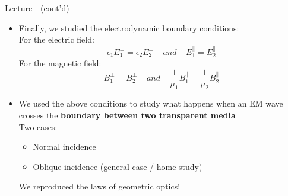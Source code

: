 \begin{frame}{Lecture \summarizedlecture - \lecturesummarytitle (cont'd)}

\begin{itemize}

\item Finally, we studied the electrodynamic boundary conditions:\\
          \vspace{0.2cm}
         For the electric field:
         \begin{equation*}
               \epsilon_1 E_1^{\perp} = \epsilon_2 E_2^{\perp}  \;\;\;\; and \;\;\;\;
                E_1^{\parallel} = E_2^{\parallel}
         \end{equation*}
         For the magnetic field:
         \begin{equation*}
               B_1^{\perp} = B_2^{\perp} \;\;\;\; and \;\;\;\;
               \frac{1}{\mu_1} B_1^{\parallel} = \frac{1}{\mu_2} B_2^{\parallel}
         \end{equation*}

\item We used the above conditions to study what happens when
          an EM wave crosses the {\bf boundary between two transparent media}\\
          \vspace{0.2cm}
          Two cases:
          \begin{itemize}
               \item Normal incidence
               \item Oblique incidence (general case / home study)
          \end{itemize}
      We reproduced the laws of geometric optics!
\end{itemize}

\end{frame}



